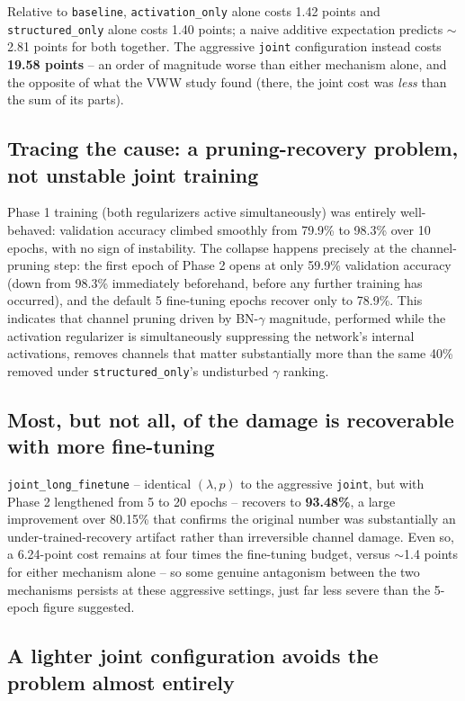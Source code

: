 \documentclass[11pt]{article}
\newcommand{\code}[1]{\texttt{#1}}
\begin{document}
Relative to \code{baseline}, \code{activation\_only} alone costs 1.42 points and \code{structured\_only} alone costs 1.40 points; a naive additive expectation predicts $\sim$2.81 points for both together. The aggressive \code{joint} configuration instead costs \textbf{19.58 points} -- an order of magnitude worse than either mechanism alone, and the opposite of what the VWW study found (there, the joint cost was \emph{less} than the sum of its parts).

\subsection{Tracing the cause: a pruning-recovery problem, not unstable joint training}

Phase 1 training (both regularizers active simultaneously) was entirely well-behaved: validation accuracy climbed smoothly from 79.9\% to 98.3\% over 10 epochs, with no sign of instability. The collapse happens precisely at the channel-pruning step: the first epoch of Phase 2 opens at only 59.9\% validation accuracy (down from 98.3\% immediately beforehand, before any further training has occurred), and the default 5 fine-tuning epochs recover only to 78.9\%. This indicates that channel pruning driven by BN-$\gamma$ magnitude, performed while the activation regularizer is simultaneously suppressing the network's internal activations, removes channels that matter substantially more than the same 40\% removed under \code{structured\_only}'s undisturbed $\gamma$ ranking.

\subsection{Most, but not all, of the damage is recoverable with more fine-tuning}

\code{joint\_long\_finetune} -- identical $(\lambda, p)$ to the aggressive \code{joint}, but with Phase 2 lengthened from 5 to 20 epochs -- recovers to \textbf{93.48\%}, a large improvement over 80.15\% that confirms the original number was substantially an under-trained-recovery artifact rather than irreversible channel damage. Even so, a 6.24-point cost remains at four times the fine-tuning budget, versus $\sim$1.4 points for either mechanism alone -- so some genuine antagonism between the two mechanisms persists at these aggressive settings, just far less severe than the 5-epoch figure suggested.

\subsection{A lighter joint configuration avoids the problem almost entirely}
\end{document}
